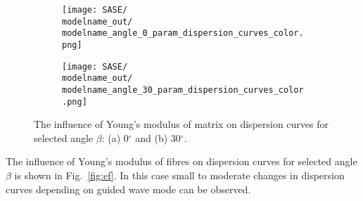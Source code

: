 \documentclass[preprint,12pt]{elsarticle}
\begin{document}
\begin{figure} [h!]
	\centering
	\newcommand{\modelname}{SASE4_plain_weave}
	\begin{subfigure}[b]{0.49\textwidth}
		\centering
		\texttt{[image: SASE/\\modelname\_out/\\modelname\_angle\_0\_param\_dispersion\_curves\_color.png]}
		\caption{}
		\label{fig:em0}
	\end{subfigure}
	\hfill
	\begin{subfigure}[b]{0.49\textwidth}
		\centering
		\texttt{[image: SASE/\\modelname\_out/\\modelname\_angle\_30\_param\_dispersion\_curves\_color.png]}
		\caption{}
		\label{fig:em30}
	\end{subfigure}
	\caption{The influence of Young's modulus of matrix  on dispersion curves for selected angle $\beta$: (a) 0$^{\circ}$ and (b) 30$^{\circ}$.} 
	\label{fig:em}
\end{figure}

The influence of Young's modulus of fibres on dispersion curves for selected angle $\beta$ is shown in Fig.~\ref{fig:ef}. In this case small to moderate changes in dispersion curves depending on guided wave mode can be observed. 
\end{document}
